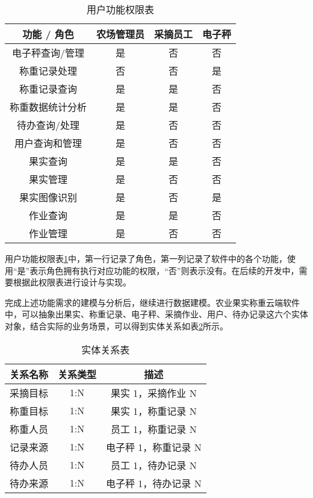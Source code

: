 \begin{table}[ht]
\centering
\caption{用户功能权限表}
\label{tab:user_permissions}
\begin{tabular}{|c|c|c|c|}
\hline
 功能 / 角色              & 农场管理员 & 采摘员工 & 电子秤 \\ \hline
电子秤查询/管理  & 是 & 否 & 否 \\ \hline
称重记录处理        & 否 & 否 & 是 \\ \hline
称重记录查询        & 是 & 是 & 否 \\ \hline
称重数据统计分析        & 是 & 是 & 否 \\ \hline
待办查询/处理    & 是 & 否 & 否  \\ \hline
用户查询和管理 & 是 & 否 & 否 \\ \hline
果实查询 & 是 & 是 & 否 \\ \hline
果实管理 & 是 & 否 & 否 \\ \hline
果实图像识别 & 是 & 否 & 是 \\ \hline
作业查询 & 是 & 是 & 否 \\ \hline
作业管理 & 是 & 否 & 否 \\ \hline
\end{tabular}
\vspace{10pt}
\end{table}

用户功能权限表\ref{tab:user_permissions}中，第一行记录了角色，第一列记录了软件中的各个功能，使用“是”表示角色拥有执行对应功能的权限，“否”则表示没有。在后续的开发中，需要根据此权限表进行设计与实现。

完成上述功能需求的建模与分析后，继续进行数据建模。农业果实称重云端软件中，可以抽象出果实、称重记录、电子秤、采摘作业、用户、待办记录这六个实体对象，结合实际的业务场景，可以得到实体关系如表\ref{tab:ertab}所示。

\begin{table}[H]
\centering
\caption{实体关系表}
\label{tab:ertab}
\begin{tabular}{|c|c|c|}
\hline
关系名称 & 关系类型 & 描述 \\ \hline

采摘目标 & 1:N & 果实 1，采摘作业 N \\ \hline

称重目标 & 1:N & 果实 1，称重记录 N \\ \hline

称重人员 & 1:N & 员工 1，称重记录 N  \\ \hline

记录来源 & 1:N & 电子秤 1，称重记录 N \\ \hline

待办人员 & 1:N & 员工 1，待办记录 N \\ \hline

待办来源 & 1:N & 电子秤 1，待办记录 N \\ \hline

\end{tabular}%
\end{table}

